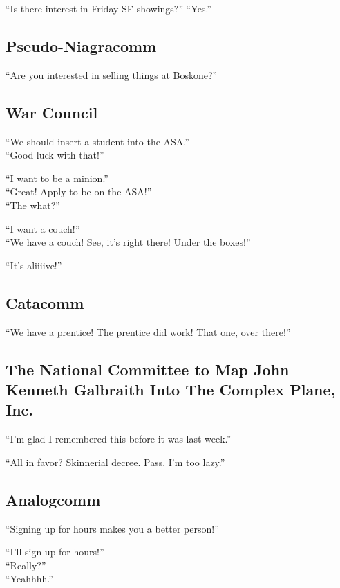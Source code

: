 \documentclass[10pt]{article}
\begin{document}
``Is there interest in Friday SF showings?'' 
``Yes.''

\subsection*{Pseudo-Niagracomm}

``Are you interested in selling things at Boskone?''

\subsection*{War Council}

``We should insert a student into the ASA.''\\
  ``Good luck with that!''  

``I want to be a minion.''\\
``Great!  Apply to be on the ASA!''\\
``The what?''

``I want a couch!''\\
``We have a couch!  See, it's right there!  Under the boxes!''

``It's aliiiive!''

\subsection*{Catacomm}

``We have a prentice!  The prentice did work!  That one, over there!''

\subsection*{The National Committee to Map John Kenneth Galbraith Into The Complex Plane, Inc.}

``I'm glad I remembered this before it was last week.''

``All in favor?  Skinnerial decree.  Pass.  I'm too lazy.''

\subsection*{Analogcomm}

``Signing up for hours makes you a better person!''

``I'll sign up for hours!''\\
``Really?''\\
``Yeahhhh.''\\
\end{document}
